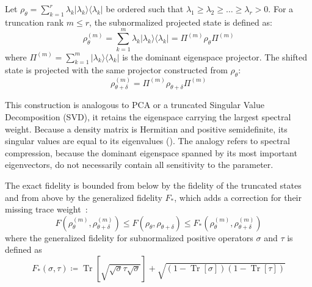 \begin{definition}
    Let $\rho_\theta = \sum_{k=1}^r \lambda_k |\lambda_k\rangle\langle\lambda_k|$ be ordered such that $\lambda_1 \ge \lambda_2 \ge \dots \ge \lambda_r > 0$. For a truncation rank $m \le r$, the subnormalized projected state is defined as:
    \begin{equation}
        \rho_\theta^{(m)} = \sum_{k=1}^m \lambda_k |\lambda_k\rangle\langle\lambda_k| = \Pi^{(m)} \rho_\theta \Pi^{(m)}
    \end{equation}
    where $\Pi^{(m)} = \sum_{k=1}^m |\lambda_k\rangle\langle\lambda_k|$ is the dominant eigenspace projector.
    The shifted state is projected with the same projector constructed from $\rho_\theta$:
    \begin{equation}
        \rho_{\theta+\delta}^{(m)}
        =\Pi^{(m)}\rho_{\theta+\delta}\Pi^{(m)}
        \label{eq:shifted_rank_truncated_state}
    \end{equation}
\end{definition}
\begin{remark}
    This construction is analogous to PCA or a truncated Singular Value Decomposition (SVD), it retains the eigenspace carrying the largest spectral weight. Because a density matrix is Hermitian and positive semidefinite, its singular values are equal to its eigenvalues (\cite{horn_johnson_2012_matrix}). The analogy refers to spectral compression, because the dominant eigenspace spanned by its most important eigenvectors, do not necessarily contain all  sensitivity to the parameter.
\end{remark}

\begin{theorem}
    The exact fidelity is bounded from below by the fidelity of the truncated states and from above by the generalized fidelity $F_*$, which adds a correction for their missing trace weight~\cite{beckey2022vqfiea}:
    \begin{equation}
        F\left(\rho_\theta^{(m)}, \rho_{\theta+\delta}^{(m)}\right) \le F(\rho_\theta, \rho_{\theta+\delta}) \le F_*\left(\rho_\theta^{(m)}, \rho_{\theta+\delta}^{(m)}\right)
        \label{eq:truncated_fidelity_inequality}
    \end{equation}
    where the generalized fidelity for subnormalized positive operators $\sigma$ and $\tau$ is defined as
    \begin{equation}
        F_*(\sigma, \tau) \coloneqq \operatorname{Tr}\left[\sqrt{\sqrt{\sigma}\tau\sqrt{\sigma}}\right] + \sqrt{(1 - \operatorname{Tr}[\sigma])(1 - \operatorname{Tr}[\tau])}
    \end{equation}
\end{theorem}

